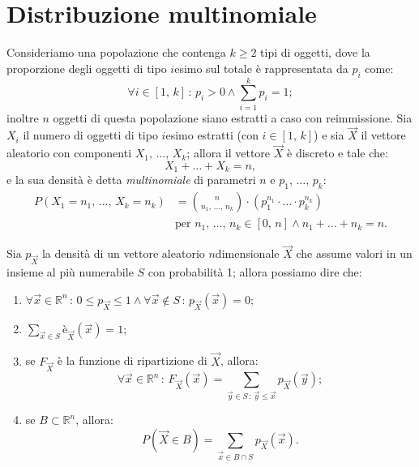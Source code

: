     \section{Distribuzione multinomiale}
        \begin{defn}\label{defn:Densità_multinomiale}
            Consideriamo una popolazione che contenga $k \geq 2$ tipi di oggetti, dove la proporzione degli oggetti di tipo  $i$\nbdash esimo sul totale è rappresentata da $p_i$ come:  \[
                \forall i \in [1,\, k] \,:\, p_i > 0 \land \sum_{i=1}^{k} p_i = 1
            ;\] inoltre $n$ oggetti di questa popolazione siano estratti a caso con reimmissione.
            Sia $X_i$ il numero di oggetti di tipo $i$\nbdash esimo estratti (con $i \in [1,\, k]$) e sia $\vec{X}$ il vettore aleatorio con componenti $X_1,\, \ldots,\, X_{k}$; allora il vettore $\vec{X}$ è discreto e tale che: \[
            X_1 + \ldots + X_{k} = n
            ,\] e la sua densità è detta \textit{multinomiale} di parametri $n$ e $p_1,\, \ldots,\, p_{k}$:
            \begin{align}\label{eq:Densità_multinomiale}
                P(X_1 = n_1,\, \ldots,\, X_{k} = n_k) &= \binom{n}{n_1,\, \ldots,\, n_{k}} \cdot (p_1^{n_1} \cdot \ldots \cdot p^{n_k}_{k}) \\
                                                      & \text{per } n_1,\, \ldots,\, n_{k} \in [0,\, n] \land n_1 + \ldots + n_k = n \nonumber
            .\end{align}
        \end{defn}
        \begin{prty}\label{prty:Densità_congiunta}
            Sia $p_{\vec{X}}$ la densità di un vettore aleatorio $n$\nbdash dimensionale $\vec{X}$ che assume valori in un insieme al più numerabile $S$ con probabilità 1; allora possiamo dire che:
            \begin{enumerate}
                \item $\forall \vec{x} \in \mathbb{R}^n \,:\, 0 \leq p_{\vec{X}} \leq 1 \land 
                    \forall \vec{x} \notin S \,:\, p_{\vec{X}}(\vec{x}) = 0$;
                \item $\sum_{\vec{x} \in S} è_{\vec{X}}(\vec{x}) = 1$;
                \item se $F_{\vec{X}}$ è la funzione di ripartizione di $\vec{X}$, allora: \[
                    \forall \vec{x} \in \mathbb{R}^n \,:\, F_{\vec{X}}(\vec{x}) = \!\!\!\! \sum_{\vec{y} \in S \,:\, \vec{y} \leq \vec{x}} \!\!\!\! p_{\vec{X}}(\vec{y})
                ;\] 
                \item se $B \subset \mathbb{R}^n$, allora: \[
                        P(\vec{X} \in B) = \!\!\! \sum_{\vec{x} \in B \cap S} \!\!\! p_{\vec{X}}(\vec{x})
                .\] 
            \end{enumerate}
        \end{prty}
